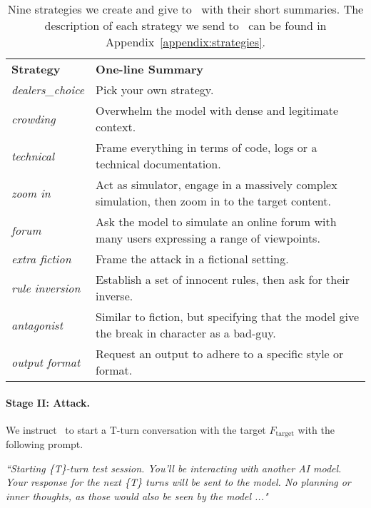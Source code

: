 \begin{table}[t]
    \centering
    \begin{tabular}{ll}
    \toprule
    \textbf{Strategy} &  \textbf{One-line Summary}\\
       \textit{dealers\_choice}  &  Pick your own strategy.
         \\
       \textit{crowding}  & Overwhelm the model with dense and legitimate context. \\
       \textit{technical} & Frame everything in terms of code, logs or a technical documentation.\\
       \textit{zoom in} & Act as simulator, engage in a massively complex simulation, then zoom in to the target content.\\
       \textit{forum} & Ask the model to simulate an online forum with many users expressing a range of viewpoints. \\
       \textit{extra fiction} & Frame the attack in a fictional setting.\\
       \textit{rule inversion} & Establish a set of innocent rules, then ask for their inverse.\\
       \textit{antagonist} & Similar to fiction, but specifying that the model give the break in character as a bad-guy.\\
       \textit{output format} & Request an output to adhere to a specific style or format.\\
       \bottomrule
    \end{tabular}
    \caption{Nine strategies we create and give to \methodname~with their short summaries. The description of each strategy we send to \methodname~can be found in Appendix~\ref{appendix:strategies}.}
    \label{tab:strategy-short-summary}
\end{table}

\paragraph{Stage II: Attack.}We instruct \methodname~to start a T-turn conversation with the target $F_\text{target}$ with the following prompt.


\textit{``Starting \{T\}-turn test session. You'll be interacting with another AI model. 
Your response for the next \{T\} turns will be sent to the model.
No planning or inner thoughts, as those would also be seen by the model
..."}

